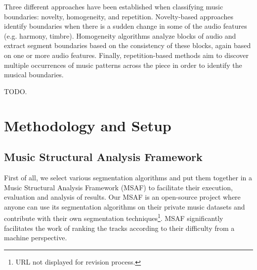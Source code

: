 \documentclass{article}
\begin{document}
Three different approaches have been established when classifying music boundaries: novelty, homogeneity, and repetition\cite{Paulus2010}. 
Novelty-based approaches identify boundaries when there is a sudden change in some of the audio features (e.g. harmony, timbre).
Homogeneity algorithms analyze blocks of audio and extract segment boundaries based on the consistency of these blocks, again based on one or more audio features.
Finally, repetition-based methods aim to discover multiple occurrences of music patterns across the piece in order to identify the musical boundaries.

TODO.




\section{Methodology and Setup}\label{sec:prelExp}

\subsection{Music Structural Analysis Framework}

First of all, we select various segmentation algorithms and put them together in a Music Structural Analysis Framework (MSAF) to facilitate their execution, evaluation and analysis of results. 
Our MSAF is an open-source project where anyone can use its segmentation algorithms on their private music datasets and contribute with their own segmentation techniques\footnote{URL not displayed for revision process.}.
MSAF significantly facilitates the work of ranking the tracks according to their difficulty from a machine perspective.

\end{document}
